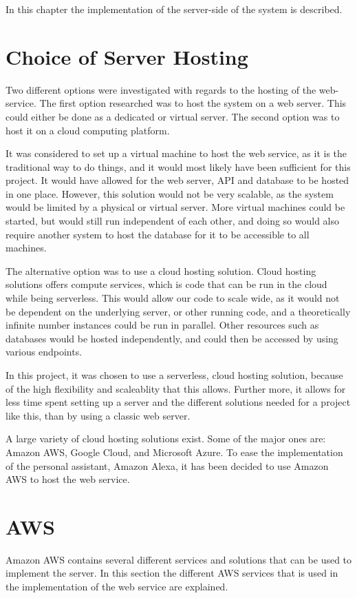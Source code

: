 In this chapter the implementation of the server-side of the system is described. 

\section{Choice of Server Hosting}
Two different options were investigated with regards to the hosting of the web-service. The first option researched was to host the system on a web server. This could either be done as a dedicated or virtual server. The second option was to host it on a cloud computing platform.

It was considered to set up a virtual machine to host the web service, as it is the traditional way to do things, and it would most likely have been sufficient for this project. It would have allowed for the web server, API and database to be hosted in one place. However, this solution would not be very scalable, as the system would be limited by a physical or virtual server. More virtual machines could be started, but would still run independent of each other, and doing so would also require another system to host the database for it to be accessible to all machines.

The alternative option was to use a cloud hosting solution. Cloud hosting solutions offers compute services, which is code that can be run in the cloud while being serverless. This would allow our code to scale wide, as it would not be dependent on the underlying server, or other running code, and a theoretically infinite number instances could be run in parallel. Other resources such as databases would be hosted independently, and could then be accessed by using various endpoints.

In this project, it was chosen to use a serverless, cloud hosting solution, because of the high flexibility and scaleablity that this allows. Further more, it allows for less time spent setting up a server and the different solutions needed for a project like this, than by using a classic web server.

A large variety of cloud hosting solutions exist. Some of the major ones are: Amazon AWS, Google Cloud, and Microsoft Azure. To ease the implementation of the personal assistant, Amazon Alexa, it has been decided to use Amazon AWS to host the web service.

\section{AWS}
\label{sec:aws}
Amazon AWS contains several different services and solutions that can be used to implement the server. In this section the different AWS services that is used in the implementation of the web service are explained.

